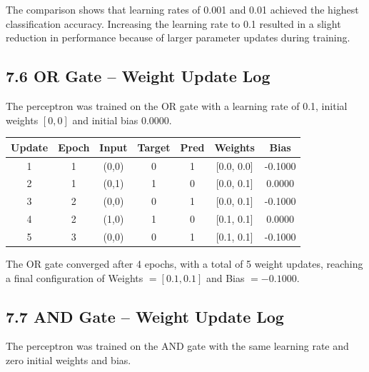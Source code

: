 \documentclass[11pt,a4paper]{article}
\begin{document}
The comparison shows that learning rates of 0.001 and 0.01 achieved the highest classification accuracy. Increasing the learning rate to 0.1 resulted in a slight reduction in performance because of larger parameter updates during training.


 








\subsection*{7.6 OR Gate -- Weight Update Log}

The perceptron was trained on the OR gate with a learning rate of 0.1, initial weights $[0,0]$ and initial bias $0.0000$.

\begin{center}
\begin{tabular}{|c|c|c|c|c|c|c|}
\hline
\textbf{Update} & \textbf{Epoch} & \textbf{Input} & \textbf{Target} & \textbf{Pred} & \textbf{Weights} & \textbf{Bias}\\
\hline
1 & 1 & (0,0) & 0 & 1 & [0.0, 0.0] & -0.1000\\
\hline
2 & 1 & (0,1) & 1 & 0 & [0.0, 0.1] & 0.0000\\
\hline
3 & 2 & (0,0) & 0 & 1 & [0.0, 0.1] & -0.1000\\
\hline
4 & 2 & (1,0) & 1 & 0 & [0.1, 0.1] & 0.0000\\
\hline
5 & 3 & (0,0) & 0 & 1 & [0.1, 0.1] & -0.1000\\
\hline
\end{tabular}
\end{center}

\vspace{0.15cm}

The OR gate converged after 4 epochs, with a total of 5 weight updates, reaching a final configuration of Weights $= [0.1, 0.1]$ and Bias $= -0.1000$.


\subsection*{7.7 AND Gate -- Weight Update Log}

The perceptron was trained on the AND gate with the same learning rate and zero initial weights and bias.
\end{document}
